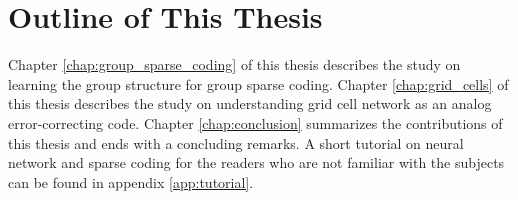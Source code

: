 \section{Outline of This Thesis}
Chapter \ref{chap:group_sparse_coding} of this thesis describes the study on learning the group structure for group sparse coding. Chapter \ref{chap:grid_cells} of this thesis describes the study on understanding grid cell network as an analog error-correcting code. Chapter \ref{chap:conclusion} summarizes the contributions of this thesis and ends with a concluding remarks. A short tutorial on neural network and sparse coding for the readers who are not familiar with the subjects can be found in appendix \ref{app:tutorial}.